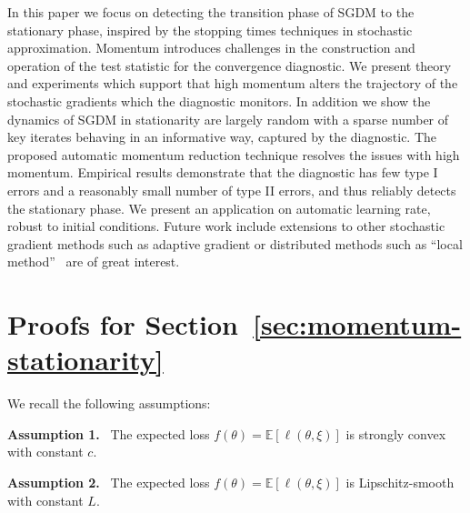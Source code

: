 \documentclass[conference]{IEEEtran}
\newcommand{\Ex}[1]{\mathbb{E}[ #1 ]}
\begin{document}
In this paper we focus on detecting the transition phase of SGDM to the stationary phase, inspired by the stopping times techniques in stochastic approximation. 
Momentum introduces challenges in the construction and operation of the test statistic for the convergence diagnostic.
We present theory and experiments which support that high momentum alters the trajectory of the stochastic gradients which the diagnostic monitors. 
In addition we show the dynamics of SGDM in stationarity are largely random with a sparse number of key iterates behaving in an informative way, captured by the diagnostic.
The proposed automatic momentum reduction technique resolves the issues with high momentum. 
Empirical results demonstrate that the diagnostic has few type I errors and a reasonably small number of type II errors, and thus reliably detects the stationary phase.
We present an application on automatic learning rate, robust to initial conditions.
Future work include extensions to other stochastic gradient methods such as adaptive gradient or distributed methods such as ``local method''~\cite{Proc:Chen_FODS20} are  of great interest.

\vspace{0.08in}





\clearpage
\onecolumn 

\appendix 


\section*{Proofs for Section~\ref{sec:momentum-stationarity}}


\noindent We recall the following assumptions:

\vspace{0.05in}

\noindent\textbf{Assumption 1.} \ The expected loss $f(\theta) = \Ex{ \ell(\theta, \xi) }$ is strongly convex with constant $c$.

\vspace{0.05in}

\noindent\textbf{Assumption 2.} \ The expected loss $f(\theta) = \Ex{ \ell(\theta, \xi) }$ is Lipschitz-smooth with constant $L$.
\end{document}
